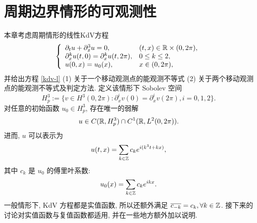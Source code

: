 \chapter{周期边界情形的可观测性}
    
     本章考虑周期情形的线性KdV方程
    \begin{align}\label{kdv-l}
        \left\lbrace \begin{array}{ll}\partial_t u +\partial_x^3u=0, & (t,x)\in \mathbb{R}\times (0,2\pi), \\
        \partial_x^ku(t,0)=\partial_x^k u(t,2\pi), & 0\le k\le 2,\\
        u(0,x)=u_0(x), & x\in (0,2\pi),
        \end{array}\right.
    \end{align}
       并给出方程 \eqref{kdv-l} (1) 关于一个移动观测点的能观测不等式 (2) 关于两个移动观测点的能观测不等式及判定方法.
    定义该情形下 Sobolev 空间
    \begin{equation*}
        H^3_p:=\lbrace v\in H^3 (0,2\pi):\partial_x^i v(0)=\partial_x^i v(2\pi), i=0,1,2 \rbrace.
    \end{equation*}
    对任意的初始函数 $u_0\in H_p^3$, 存在唯一的弱解
    \begin{equation*}
        u\in C(\mathbb{R}, H^3_p)\cap C^1(\mathbb{R},L^2(0,2\pi)).
    \end{equation*}
    进而, $u$ 可以表示为
    \begin{equation}
        u(t,x)=\sum_{k\in\mathbb{Z}}c_k e^{i(k^3t+kx)},
    \end{equation}
    其中 $c_k$ 是 $u_0$ 的傅里叶系数:
    \begin{equation*}
        u_0(x)=\sum_{k\in \mathbb{Z}} c_ke^{ikx}.
    \end{equation*}
    一般情形下, KdV 方程都是实值函数, 所以还额外满足 $\overline{c_{-k}}=c_k, \forall k\in \mathbb{Z}$. 接下来的讨论对实值函数与复值函数都适用, 并在一些地方额外加以说明.
